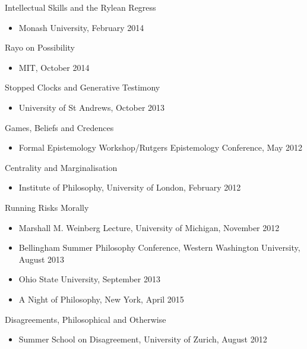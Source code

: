 \documentclass[
  10pt,
  letterpaper,
  DIV=11,
  numbers=noendperiod,
  twoside]{scrartcl}
\providecommand{\tightlist}{%
  \setlength{\itemsep}{0pt}\setlength{\parskip}{0pt}}\usepackage{longtable,booktabs,array}
\begin{document}
Intellectual Skills and the Rylean Regress

\begin{itemize}
\tightlist
\item
  Monash University, February 2014
\end{itemize}

Rayo on Possibility

\begin{itemize}
\tightlist
\item
  MIT, October 2014
\end{itemize}

Stopped Clocks and Generative Testimony

\begin{itemize}
\tightlist
\item
  University of St Andrews, October 2013
\end{itemize}

\newpage

Games, Beliefs and Credences

\begin{itemize}
\tightlist
\item
  Formal Epistemology Workshop/Rutgers Epistemology Conference, May 2012
\end{itemize}

Centrality and Marginalisation

\begin{itemize}
\tightlist
\item
  Institute of Philosophy, University of London, February 2012
\end{itemize}

Running Risks Morally

\begin{itemize}
\tightlist
\item
  Marshall M. Weinberg Lecture, University of Michigan, November 2012
\item
  Bellingham Summer Philosophy Conference, Western Washington
  University, August 2013
\item
  Ohio State University, September 2013
\item
  A Night of Philosophy, New York, April 2015
\end{itemize}

Disagreements, Philosophical and Otherwise

\begin{itemize}
\tightlist
\item
  Summer School on Disagreement, University of Zurich, August 2012
\end{itemize}
\end{document}
